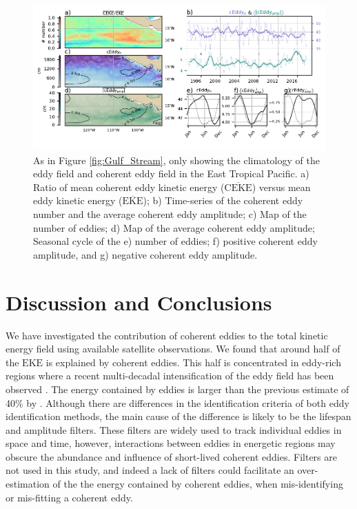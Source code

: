 \documentclass[draft,linenumbers]{agujournal2019}
\newcommand{\MEKE}{\overline{\textrm{EKE}}}
\newcommand{\EKE}{\textrm{EKE}}
\newcommand{\MCEKE}{\overline{\textrm{CEKE}}}
\begin{document}
	\begin{figure}
	    \centering
	    \includegraphics[width=1\textwidth]{figures/regional_ratios_and_stats_V3_3.pdf}
	    \caption{As in Figure \ref{fig:Gulf_Stream}, only showing the  climatology of the eddy field and coherent eddy field in the East Tropical Pacific. a) Ratio of mean coherent eddy kinetic energy ($\MCEKE$) versus mean eddy kinetic energy ($\MEKE$); b) Time-series of the coherent eddy number and the average coherent eddy amplitude; c) Map of the number of eddies; d) Map of the average coherent eddy amplitude; Seasonal cycle of the e) number of eddies; f) positive coherent eddy amplitude, and g) negative coherent eddy amplitude.}
	    \label{fig:tehuantepec}
	\end{figure}	


	\section{Discussion and Conclusions}	
	\label{sec:Conclusions}

	We have investigated the contribution of coherent eddies to the total kinetic energy field using available satellite observations. 
	We found that around half of the $\EKE$ is explained by coherent eddies. 
	This half is concentrated in eddy-rich regions where a recent multi-decadal intensification of the eddy field has been observed \citep{Martinez_Kinetic_2021}. The energy contained by eddies is larger than the previous estimate of 40\% by \citet{Chelton_The_2011}.
	Although there are differences in the identification criteria of both eddy identification methods, the main cause of the difference is likely to be the lifespan and amplitude filters. 
	These filters are widely used to track individual eddies in space and time, however, interactions between eddies in energetic regions may obscure the abundance and influence of short-lived coherent eddies. 
	Filters are not used in this study, and indeed a lack of filters could facilitate an over-estimation of the the energy contained by coherent eddies, when mis-identifying or mis-fitting a coherent eddy. 
\end{document}
